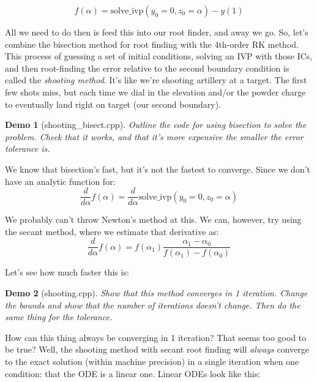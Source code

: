 \documentclass{article}
\theoremstyle{demo}
\newtheorem{demo}{Demo}[section]
\begin{document}
\begin{equation}
    f(\alpha) = \mathrm{solve\_ivp}(y_0=0,z_0=\alpha) - y(1)
\end{equation}

All we need to do then is feed this into our root finder, and away we go.  So,
let's combine the bisection method for root finding with the 4th-order RK
method.  This process of guessing a set of initial conditions, solving an IVP
with those ICs, and then root-finding the error relative to the second boundary
condition is called the \textit{shooting method}.  It's like we're shooting
artillery at a target.  The first few shots miss, but each time we dial in the
elevation and/or the powder charge to eventually land right on target (our
second boundary).

\begin{demo}[shooting\_bisect.cpp]
    Outline the code for using bisection to solve the problem.  Check that it
    works, and that it's more expensive the smaller the error tolerance is.
\end{demo}

We know that bisection's fast, but it's not the fastest to converge.  Since we
don't have an analytic function for:
\begin{equation}
    \frac{d}{d\alpha}f(\alpha) = \frac{d}{d\alpha} \mathrm{solve\_ivp}(y_0=0,z_0=\alpha) 
\end{equation}

We probably can't throw Newton's method at this.  We can, however, try using the
secant method, where we estimate that derivative as:
\begin{equation}
    \frac{d}{d\alpha}f(\alpha) = f(\alpha_{1})\frac{\alpha_{1} -
    \alpha_{0}}{f(\alpha_1)-f(\alpha_0)}
\end{equation}

Let's see how much faster this is:
\begin{demo}[shooting.cpp]
    Show that this method converges in 1 iteration.  Change the bounds and show
    that the number of iterations doesn't change.  Then do the same thing for
    the tolerance.
\end{demo}

How can this thing always be converging in 1 iteration?  That seems too good to
be true?  Well, the shooting method with secant root finding will
\textit{always} converge to the exact solution (within machine precision) in a
single iteration when one condition: that the ODE is a linear one.  Linear ODEs
look like this:
\end{document}
